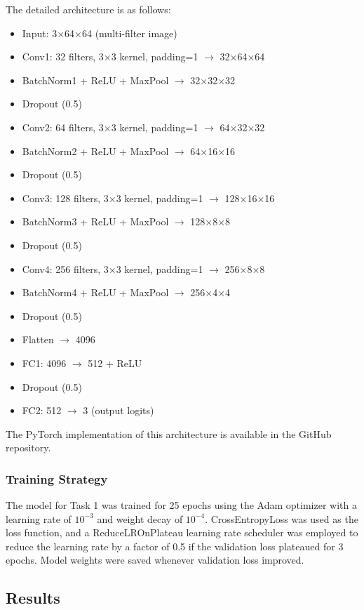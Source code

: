 \documentclass[11pt,a4paper]{article}
\begin{document}
The detailed architecture is as follows:
\begin{itemize}
    \item Input: 3×64×64 (multi-filter image)
    \item Conv1: 32 filters, 3×3 kernel, padding=1 $\rightarrow$ 32×64×64
    \item BatchNorm1 + ReLU + MaxPool $\rightarrow$ 32×32×32
    \item Dropout (0.5)
    \item Conv2: 64 filters, 3×3 kernel, padding=1 $\rightarrow$ 64×32×32
    \item BatchNorm2 + ReLU + MaxPool $\rightarrow$ 64×16×16
    \item Dropout (0.5)
    \item Conv3: 128 filters, 3×3 kernel, padding=1 $\rightarrow$ 128×16×16
    \item BatchNorm3 + ReLU + MaxPool $\rightarrow$ 128×8×8
    \item Dropout (0.5)
    \item Conv4: 256 filters, 3×3 kernel, padding=1 $\rightarrow$ 256×8×8
    \item BatchNorm4 + ReLU + MaxPool $\rightarrow$ 256×4×4
    \item Dropout (0.5)
    \item Flatten $\rightarrow$ 4096
    \item FC1: 4096 $\rightarrow$ 512 + ReLU
    \item Dropout (0.5)
    \item FC2: 512 $\rightarrow$ 3 (output logits)
\end{itemize}
The PyTorch implementation of this architecture is available in the GitHub repository.

\subsubsection{Training Strategy}
The model for Task 1 was trained for 25 epochs using the Adam optimizer with a learning rate of $10^{-3}$ and weight decay of $10^{-4}$.  CrossEntropyLoss was used as the loss function, and a ReduceLROnPlateau learning rate scheduler was employed to reduce the learning rate by a factor of 0.5 if the validation loss plateaued for 3 epochs. Model weights were saved whenever validation loss improved.

\subsection{Results}
\end{document}
